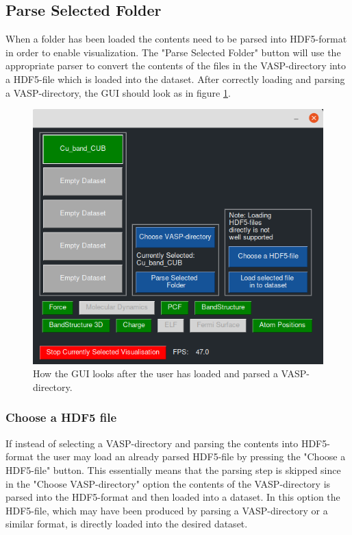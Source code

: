 \subsection{Parse Selected Folder}
When a folder has been loaded the contents need to be parsed into HDF5-format in order to enable visualization. The "Parse Selected Folder" button will use the appropriate parser to convert the contents of the files in the VASP-directory into a HDF5-file which is loaded into the dataset. After correctly loading and parsing a VASP-directory, the GUI should look as in figure \ref{fig:newGUI_parsedVASP}.

\begin{figure}[H]
    \centering
    \includegraphics[scale = 0.56]{Images/newGUI_parsedVASPdir.png}
    \caption{How the GUI looks after the user has loaded and parsed a VASP-directory.}
    \label{fig:newGUI_parsedVASP}
\end{figure}

\subsubsection{Choose a HDF5 file}
If instead of selecting a VASP-directory and parsing the contents into HDF5-format the user may load an already parsed HDF5-file by pressing the "Choose a HDF5-file" button. This essentially means that the parsing step is skipped since in the "Choose VASP-directory" option the contents of the VASP-directory is parsed into the HDF5-format and then loaded into a dataset. In this option the HDF5-file, which may have been produced by parsing a VASP-directory or a similar format, is directly loaded into the desired dataset. 

